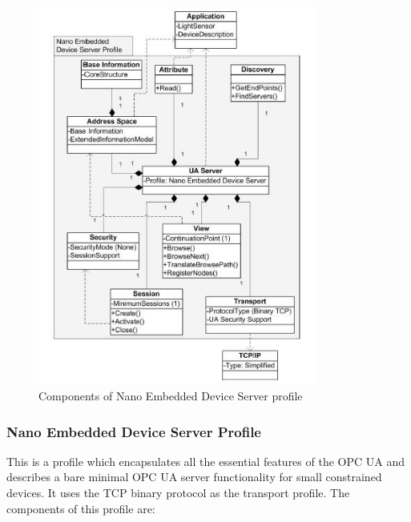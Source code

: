 \documentclass[conference]{IEEEtran}
\begin{document}
\begin{figure}[ht]
\centering
\includegraphics[height=125mm]{Figures/nano_embeddedSP}\quad
\caption[Subfigure example]{\label{f:nano_embeddedSP}Components of Nano Embedded Device Server profile \cite{6622935}}
\end{figure}


\subsubsection{Nano Embedded Device Server Profile}
This is a profile which encapsulates all the essential features of the OPC UA and describes a bare minimal OPC UA server functionality for small constrained devices. It uses the TCP binary protocol as the transport profile.
The components of this profile are\cite{6622935}:
\end{document}
